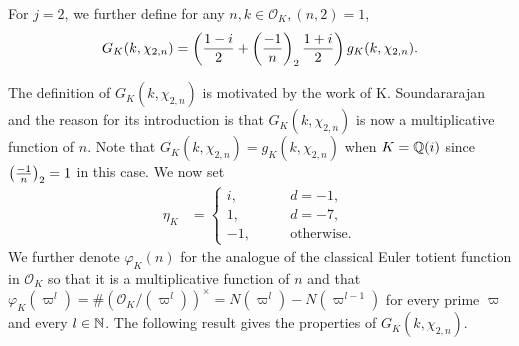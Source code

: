\documentclass[twoside,leqno,10pt, A4]{amsart}
\begin{document}
  For $j=2$, we further define for any $n,k \in \mathcal{O}_K, (n,2)=1$,
\begin{align}
\label{GKdef}
  G_K(k,\chi_{2, n}) = \left (\frac {1-i}{2}+\left(\frac{-1}{n}\right)_2\frac {1+i}{2}
 \right )g_K(k,\chi_{2, n}).
\end{align}

The definition of $G_K(k,\chi_{2, n})$ is motivated by the work of K. Soundararajan \cite[Section 2.2]{sound1} and the reason for its introduction is that $G_K(k,\chi_{2, n})$ is now a multiplicative function of $n$.  Note that $G_K(k,\chi_{2, n}) =g_K(k,\chi_{2, n})$ when $K=\mathbb Q(i)$ since $\left(\frac{-1}{n}\right)_2=1$ in this case. We now set
\begin{align}
\label{etadef}
 \eta_K & =\begin{cases}
    i, \qquad & d=-1,\\
    1, \qquad & d=-7,\\
    -1, \qquad & \text{otherwise}.
\end{cases}
\end{align}
  We further denote $\varphi_K(n)$ for the analogue of the classical Euler totient
function in $\mathcal O_K$ so that it is a multiplicative function of $n$ and that
$\varphi_K(\varpi^l)=\#(\mathcal{O}_K/(\varpi^l))^{\times}=N(\varpi^l)-N(\varpi^{l-1})$ for every prime $\varpi$ and every $l \in \mathbb{N}$.  The following result gives the properties of $G_K(k,\chi_{2, n})$.
\end{document}
